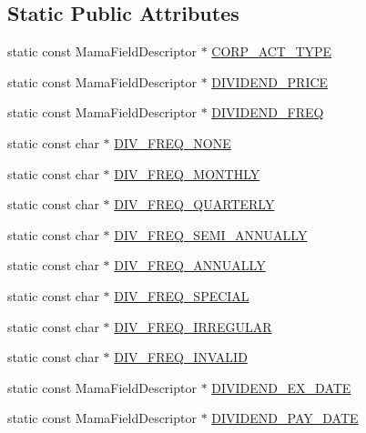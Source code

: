\subsection*{Static Public Attributes}
\begin{CompactItemize}
\item 
static const Mama\-Field\-Descriptor $\ast$ \hyperlink{classWombat_1_1MamdaFundamentalFields_81cceb7f9ea585eb1d7d6dc515e961e9}{CORP\_\-ACT\_\-TYPE}
\item 
static const Mama\-Field\-Descriptor $\ast$ \hyperlink{classWombat_1_1MamdaFundamentalFields_b8dd39ba59ae2fb95e43a853b5f7a545}{DIVIDEND\_\-PRICE}
\item 
static const Mama\-Field\-Descriptor $\ast$ \hyperlink{classWombat_1_1MamdaFundamentalFields_f841e2719b65c16b72df9a3cb3091069}{DIVIDEND\_\-FREQ}
\item 
static const char $\ast$ \hyperlink{classWombat_1_1MamdaFundamentalFields_f3d31a9f360f685cd8adcc83ca9d2a3f}{DIV\_\-FREQ\_\-NONE}
\item 
static const char $\ast$ \hyperlink{classWombat_1_1MamdaFundamentalFields_6b199a67a194b6d26687ebdb5de2b55f}{DIV\_\-FREQ\_\-MONTHLY}
\item 
static const char $\ast$ \hyperlink{classWombat_1_1MamdaFundamentalFields_bc4ece377aa2d6e4a9939b571910f4a3}{DIV\_\-FREQ\_\-QUARTERLY}
\item 
static const char $\ast$ \hyperlink{classWombat_1_1MamdaFundamentalFields_2b9fcf02ec4ba93aa98ae2246e7120eb}{DIV\_\-FREQ\_\-SEMI\_\-ANNUALLY}
\item 
static const char $\ast$ \hyperlink{classWombat_1_1MamdaFundamentalFields_a337ec65b066437b982921a94b17c88d}{DIV\_\-FREQ\_\-ANNUALLY}
\item 
static const char $\ast$ \hyperlink{classWombat_1_1MamdaFundamentalFields_a5d0bdb1c17eae49455c07cc29eb1cd4}{DIV\_\-FREQ\_\-SPECIAL}
\item 
static const char $\ast$ \hyperlink{classWombat_1_1MamdaFundamentalFields_e1286d0fb3aa76a1cf96f0903ad5fb23}{DIV\_\-FREQ\_\-IRREGULAR}
\item 
static const char $\ast$ \hyperlink{classWombat_1_1MamdaFundamentalFields_9d36af2c452a299c5ebeaecd32406682}{DIV\_\-FREQ\_\-INVALID}
\item 
static const Mama\-Field\-Descriptor $\ast$ \hyperlink{classWombat_1_1MamdaFundamentalFields_b0c6e47ab3c9b8760115c4efe2b35ce3}{DIVIDEND\_\-EX\_\-DATE}
\item 
static const Mama\-Field\-Descriptor $\ast$ \hyperlink{classWombat_1_1MamdaFundamentalFields_f6dc2abfe3a28d0cf567b516dc83907a}{DIVIDEND\_\-PAY\_\-DATE}

\end{CompactItemize}
